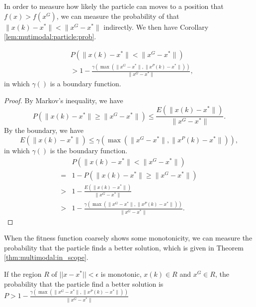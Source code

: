 In order to measure how likely the particle can moves to a position that $ f(x) > f(x^{G}) $, we can measure the probability of that $ \lVert x(k) - x^{*} \rVert < \lVert x^{G} - x^{*} \rVert $ indirectly.
We then have Corollary \ref{lem:mutimodal:particle:prob}.
\begin{mycoro}
\label{lem:mutimodal:particle:prob}
\begin{equation}
\begin{aligned}
& P( \lVert x(k) - x^{*} \rVert < \lVert x^{G} - x^{*} \rVert ) \\
& > 1 - \frac{ \gamma ( \max ( \lVert x^{G} - x^{*} \rVert , \lVert x^{P}(k) - x^{*}  \rVert ) ) }{ \lVert x^{G} - x^{*} \rVert },
\end{aligned}
\end{equation}
in which $ \gamma () $ is a boundary function.
\begin{proof}
By Markov's inequality, we have
\begin{equation}
P( \lVert x(k) - x^{*} \rVert \geq \lVert x^{G} - x^{*} \rVert ) \leq \frac{ E( \lVert x(k) - x^{*} \rVert ) }{ \lVert x^{G} - x^{*} \rVert }.
\end{equation} 
By the boundary, we have
\begin{equation}
E( \lVert x(k) - x^{*} \rVert ) \leq \gamma ( \max ( \lVert x^{G} - x^{*} \rVert , \lVert x^{P}(k) - x^{*}  \rVert ) ),
\end{equation}
in which $ \gamma () $ is the boundary function.
\begin{equation}
\begin{aligned}
& P( \lVert x(k) - x^{*} \rVert < \lVert x^{G} - x^{*} \rVert ) \\
= & 1 - P( \lVert x(k) - x^{*} \rVert \geq \lVert x^{G} - x^{*} \rVert ) \\
> & 1 - \frac{ E( \lVert x(k) - x^{*} \rVert ) }{ \lVert x^{G} - x^{*} \rVert } \\
> & 1 - \frac{ \gamma ( \max ( \lVert x^{G} - x^{*} \rVert , \lVert x^{P}(k) - x^{*}  \rVert ) ) }{ \lVert x^{G} - x^{*} \rVert }.
\end{aligned}
\end{equation}
\end{proof}
\end{mycoro}

When the fitness function coarsely shows some monotonicity, we can measure the probability that the particle finds a better solution, which is given in Theorem \ref{thm:multimodal:in_scope}.

\begin{mythm}
\label{thm:multimodal:in_scope}
If the region $ R $ of $ || x - x^{*} || < \epsilon $ is monotonic, $ x(k) \in R $ and $ x^{G} \in R $, the probability that the particle find a better solution is $ P > 1 - \frac{ \gamma ( \max ( \lVert x^{G} - x^{*} \rVert , \lVert x^{P}(k) - x^{*}  \rVert ) ) }{ \lVert x^{G} - x^{*} \rVert } $
\end{mythm} 

